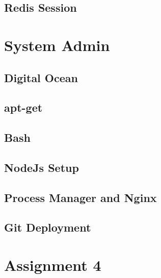 \documentclass[a4paper]{article}
\begin{document}
\subsection{Redis Session}

\section{System Admin}
\subsection{Digital Ocean}
\subsection{apt-get}
\subsection{Bash}
\subsection{NodeJs Setup}
\subsection{Process Manager and Nginx}
\subsection{Git Deployment}

\section{Assignment 4}
\end{document}
